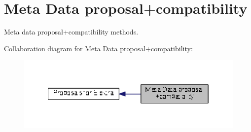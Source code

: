 \hypertarget{group__meta}{\section{Meta Data proposal+compatibility}
\label{group__meta}
}


Meta data proposal+compatibility methods.  


Collaboration diagram for Meta Data proposal+compatibility\+:
\nopagebreak
\begin{figure}[H]
\begin{center}
\leavevmode
\includegraphics[width=342pt]{group__meta}
\end{center}
\end{figure}
